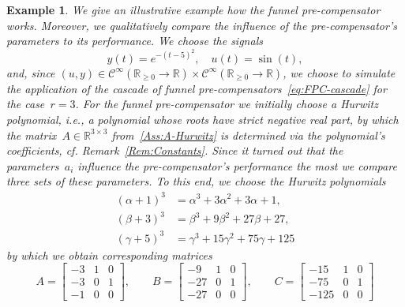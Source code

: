 \documentclass[ envcountsect, envcountsame]{svjour3}
\newtheorem{Example}[Theorem]{Example}
\newcommand{\R}{\mathbb{R}}
\newcommand{\cC}{\mathcal{C}}
\newcommand{\rp}{\mathbb{R}_{\geq 0}}
\begin{document}
\begin{Example} \label{Ex:functionality}
We give an illustrative example how the funnel pre-compensator works. 
Moreover, we qualitatively compare the influence of the pre-compensator's parameters to its performance.
We choose the signals
\begin{equation*}
y(t) = e^{-(t-5)^2},
\quad u(t) = \sin(t),
\end{equation*}
and, since $(u,y) \in \cC^\infty(\rp \to \R) \times \cC^\infty(\rp \to \R)$, we choose to simulate the application of the cascade of funnel pre-compensators~\eqref{eq:FPC-cascade} for the case~$r=3$.
%
For the funnel pre-compensator we initially choose a Hurwitz polynomial, i.e., a polynomial whose roots have strict negative real part,
by which the matrix~$A \in \R^{3 \times 3}$ from~\ref{Ass:A-Hurwitz} is determined via the polynomial's coefficients, cf. Remark~\ref{Rem:Constants}.
%
Since it turned out that the parameters~$a_i$ influence the pre-compensator's performance the most we compare three sets of these parameters. 
To this end, we choose the Hurwitz polynomials
\begin{equation*}
\begin{aligned}
(\alpha + 1)^3 &= \alpha^3 + 3\alpha^2 + 3\alpha + 1, \\
(\beta + 3)^3 &= \beta^3 + 9 \beta^2 + 27\beta + 27,\\
(\gamma + 5)^3 & = \gamma^3 + 15\gamma^2 + 75\gamma + 125
\end{aligned}
\end{equation*}
by which we obtain corresponding matrices
\begin{equation*}
A = \begin{bmatrix}
-3 & 1 & 0 \\
- 3 & 0 & 1 \\
-1 & 0 & 0
\end{bmatrix}, \qquad
%
B = \begin{bmatrix}
-9 & 1 & 0 \\
- 27 & 0 & 1 \\
-27 & 0 & 0
\end{bmatrix}, \qquad
%
C= \begin{bmatrix}
-15 & 1 & 0 \\
- 75 & 0 & 1 \\
-125 & 0 & 0
\end{bmatrix}

\end{equation*}
\end{Example}
\end{document}
